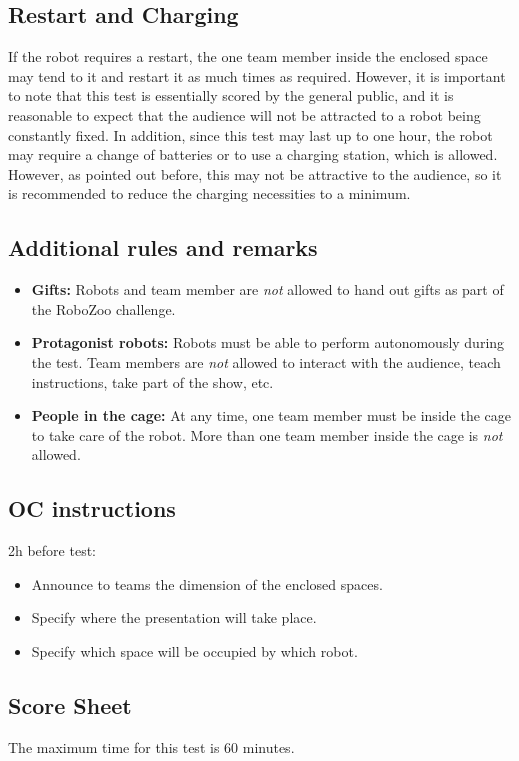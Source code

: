\subsection{Restart and Charging}
If the robot requires a restart, the one team member inside the enclosed space may tend to it and restart it as much times as required. However, it is important to note that this test is essentially scored by the general public, and it is reasonable to expect that the audience will not be attracted to a robot being constantly fixed. In addition, since this test may last up to one hour, the robot may require a change of batteries or to use a charging station, which is allowed. However, as pointed out before, this may not be attractive to the audience, so it is recommended to reduce the charging necessities to a minimum. 

\subsection{Additional rules and remarks}

\begin{itemize}
\item \textbf{Gifts:} Robots and team member are \emph{not} allowed to hand out gifts as part of the RoboZoo challenge. 
\item \textbf{Protagonist robots:} Robots must be able to perform autonomously during the test. Team members are \emph{not} allowed to interact with the audience, teach instructions, take part of the show, etc.
\item \textbf{People in the cage:} At any time, one team member must be inside the cage to take care of the robot. More than one team member inside the cage is \emph{not} allowed.
\end{itemize}

\subsection{OC instructions}

2h before test:
\begin{itemize}
\item{Announce to teams the dimension of the enclosed spaces.}
\item{Specify where the presentation will take place.}
\item{Specify which space will be occupied by which robot.}
\end{itemize}

\subsection{Score Sheet}
The maximum time for this test is 60 minutes.

